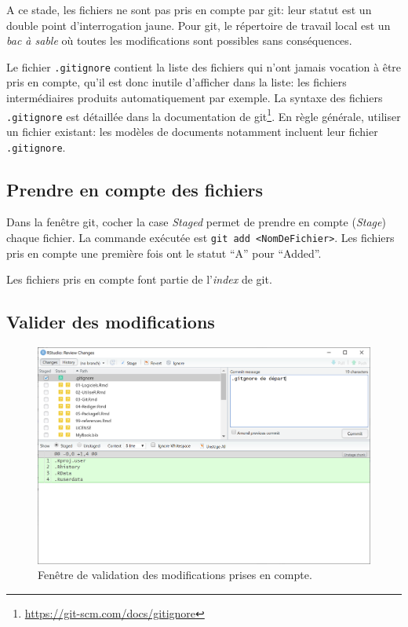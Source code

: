 \documentclass[
  12pt,
  french,
  a4paper,
  extrafontsizes,onecolumn,openright
  ]{memoir}
\begin{document}
\normalsize

A ce stade, les fichiers ne sont pas pris en compte par git: leur statut est un double point d'interrogation jaune.
Pour git, le répertoire de travail local est un \emph{bac à sable} où toutes les modifications sont possibles sans conséquences.

Le fichier \texttt{.gitignore} contient la liste des fichiers qui n'ont jamais vocation à être pris en compte, qu'il est donc inutile d'afficher dans la liste: les fichiers intermédiaires produits automatiquement par exemple.
La syntaxe des fichiers \texttt{.gitignore} est détaillée dans la documentation de git\footnote{\url{https://git-scm.com/docs/gitignore}}.
En règle générale, utiliser un fichier existant: les modèles de documents notamment incluent leur fichier \texttt{.gitignore}.

\hypertarget{prendre-en-compte-des-fichiers}{%
\subsection{Prendre en compte des fichiers}\label{prendre-en-compte-des-fichiers}}

Dans la fenêtre git, cocher la case \emph{Staged} permet de prendre en compte (\emph{Stage}) chaque fichier.
La commande exécutée est \texttt{git\ add\ \textless{}NomDeFichier\textgreater{}}.
Les fichiers pris en compte une première fois ont le statut \enquote{A} pour \enquote{Added}.

Les fichiers pris en compte font partie de l'\emph{index} de git.

\hypertarget{valider-des-modifications}{%
\subsection{Valider des modifications}\label{valider-des-modifications}}



\scriptsize

\begin{figure}

{\centering \includegraphics[width=0.8\linewidth]{images/git-Commit} 

}

\caption{Fenêtre de validation des modifications prises en compte.}\label{fig:git-Commit}
\end{figure}
\end{document}
